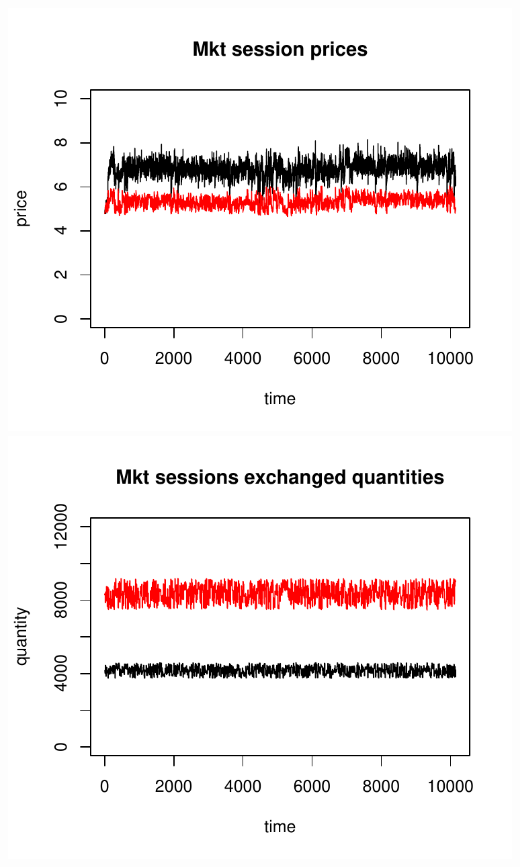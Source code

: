 \documentclass{article}
\begin{document}
\noindent
\vskip-5mm
\hskip-1cm
\includegraphics[scale=0.5]{fig_case04_prices}
\includegraphics[scale=0.5]{fig_case04_quantities}
\end{document}
